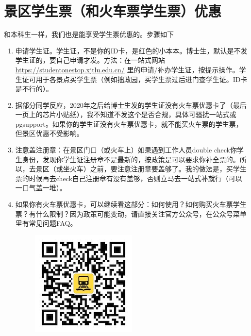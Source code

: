 \section{景区学生票（和火车票学生票）优惠}

和本科生一样，我们也是能享受学生票优惠的。步骤如下

\begin{enumerate}
    \item 申请学生证。学生证，不是你的ID卡，是红色的小本本。博士生，默认是不发学生证的，要自己申请才发。方法：在一站式网站 \url{https://studentonestop.xjtlu.edu.cn/} 里的申请/补办学生证，按提示操作。学生证可用于各景点买学生票（例如拙政园，买学生票过后进门查学生证。ID卡是不行的）。
    \item 据部分同学反应，2020年之后给博士生发的学生证没有火车票优惠卡了（最后一页上的芯片小贴纸），我不知道不发这个是否合规，具体可骚扰一站式或pgsupport。如果你的学生证没有火车票优惠卡，就不能买火车票的学生票，但景区优惠不受影响。
    \item 注意盖注册章：在景区门口（或火车上）如果遇到工作人员double check你学生身份，发现你学生证注册章不是最新的，按政策是可以要求你补全票的。所以，去景区（或坐火车）之前，要注意注册章要盖够了。我的做法是，买学生票的时候再去check自己注册章有没有盖够，否则立马去一站式补就行（可以一口气盖一堆）。
    \item 
        \begin{minipage}{0.71\textwidth}
            如果你有火车票优惠卡，可以继续看这部分：如何使用？如何购买火车票学生票？有什么限制？因为政策可能变动，请直接关注官方公众号，在公众号菜单里有常见问题FAQ。
        \end{minipage}
        \begin{minipage}{0.2\textwidth}
            \begin{figure}[H]
                \includegraphics[width=0.95\columnwidth, center]{author-folder/Kai.Wu/qrcode_huitongstudent_1.jpg}
            \end{figure}
        \end{minipage}

\end{enumerate}



